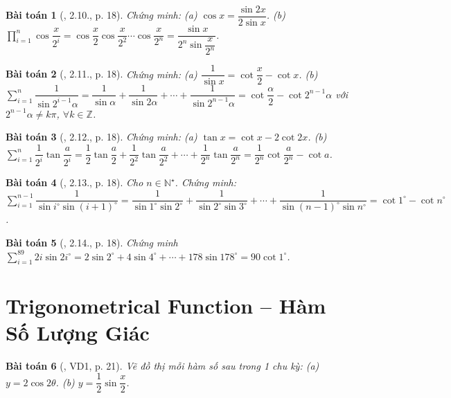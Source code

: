 \documentclass{article}
\newtheorem{baitoan}{Bài toán}
\begin{document}
\begin{baitoan}[\cite{Hung_nang_cao_phat_trien_Toan_11_tap_1}, 2.10., p. 18]
	Chứng minh: (a) $\cos x = \dfrac{\sin2x}{2\sin x}$. (b) $\prod_{i=1}^n \cos\dfrac{x}{2^i} = \cos\dfrac{x}{2}\cos\dfrac{x}{2^2}\cdots\cos\dfrac{x}{2^n} = \dfrac{\sin x}{2^n\sin\dfrac{x}{2^n}}$.
\end{baitoan}

\begin{baitoan}[\cite{Hung_nang_cao_phat_trien_Toan_11_tap_1}, 2.11., p. 18]
	Chứng minh: (a) $\dfrac{1}{\sin x} = \cot\dfrac{x}{2} - \cot x$. (b) $\sum_{i=1}^n \dfrac{1}{\sin2^{i-1}\alpha} = \dfrac{1}{\sin\alpha} + \dfrac{1}{\sin2\alpha} + \cdots + \dfrac{1}{\sin2^{n-1}\alpha} = \cot\dfrac{\alpha}{2} - \cot2^{n-1}\alpha$ với $2^{n-1}\alpha\ne k\pi$, $\forall k\in\mathbb{Z}$.
\end{baitoan}

\begin{baitoan}[\cite{Hung_nang_cao_phat_trien_Toan_11_tap_1}, 2.12., p. 18]
	Chứng minh: (a) $\tan x = \cot x - 2\cot2x$. (b) $\sum_{i=1}^n \dfrac{1}{2^i}\tan\dfrac{a}{2^i} = \dfrac{1}{2}\tan\dfrac{a}{2} + \dfrac{1}{2^2}\tan\dfrac{a}{2^2} + \cdots + \dfrac{1}{2^n}\tan\dfrac{a}{2^n} = \dfrac{1}{2^n}\cot\dfrac{a}{2^n} - \cot a$.
\end{baitoan}

\begin{baitoan}[\cite{Hung_nang_cao_phat_trien_Toan_11_tap_1}, 2.13., p. 18]
	Cho $n\in\mathbb{N}^\star$. Chứng minh: $\sum_{i=1}^{n-1} \dfrac{1}{\sin i^\circ\sin(i + 1)^\circ} = \dfrac{1}{\sin1^\circ\sin2^\circ} + \dfrac{1}{\sin2^\circ\sin3^\circ} + \cdots + \dfrac{1}{\sin(n - 1)^\circ\sin n^\circ} = \cot1^\circ - \cot n^\circ$.
\end{baitoan}

\begin{baitoan}[\cite{Hung_nang_cao_phat_trien_Toan_11_tap_1}, 2.14., p. 18]
	Chứng minh $\sum_{i=1}^{89} 2i\sin2i^\circ = 2\sin2^\circ + 4\sin4^\circ + \cdots + 178\sin178^\circ = 90\cot1^\circ$.
\end{baitoan}


\section{Trigonometrical Function -- Hàm Số Lượng Giác}

\begin{baitoan}[\cite{Hung_nang_cao_phat_trien_Toan_11_tap_1}, VD1, p. 21]
	Vẽ đồ thị mỗi hàm số sau trong 1 chu kỳ: (a) $y = 2\cos2\theta$. (b) $y = \dfrac{1}{2}\sin\dfrac{x}{2}$.
\end{baitoan}
\end{document}
